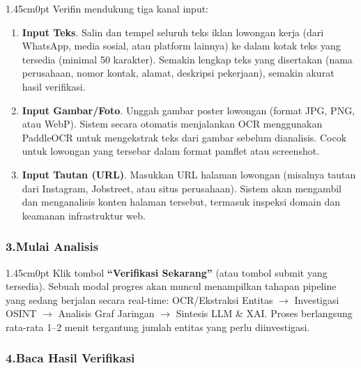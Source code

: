 \documentclass[12pt,a4paper]{article}
\begin{document}
\begin{adjustwidth}{1.45cm}{0pt}
\hspace*{0.85cm}Verifin mendukung tiga kanal input:

\begin{enumerate}[label=\textbf{\alph*.}, labelindent=0pt, leftmargin=*]
  \item \textbf{Input Teks}. Salin dan tempel seluruh teks iklan lowongan kerja (dari WhatsApp, media sosial, atau platform lainnya) ke dalam kotak teks yang tersedia (minimal 50 karakter). Semakin lengkap teks yang disertakan (nama perusahaan, nomor kontak, alamat, deskripsi pekerjaan), semakin akurat hasil verifikasi.
  \item \textbf{Input Gambar/Foto}. Unggah gambar poster lowongan (format JPG, PNG, atau WebP). Sistem secara otomatis menjalankan OCR menggunakan PaddleOCR untuk mengekstrak teks dari gambar sebelum dianalisis. Cocok untuk lowongan yang tersebar dalam format pamflet atau screenshot.
  \item \textbf{Input Tautan (URL)}. Masukkan URL halaman lowongan (misalnya tautan dari Instagram, Jobstreet, atau situs perusahaan). Sistem akan mengambil dan menganalisis konten halaman tersebut, termasuk inspeksi domain dan keamanan infrastruktur web.
\end{enumerate}
\end{adjustwidth}

\subsubsection*{3.\quad Mulai Analisis}

\begin{adjustwidth}{1.45cm}{0pt}
\hspace*{0.85cm}Klik tombol \textbf{``Verifikasi Sekarang''} (atau tombol submit yang tersedia). Sebuah modal progres akan muncul menampilkan tahapan pipeline yang sedang berjalan secara real-time: OCR/Ekstraksi Entitas $\to$ Investigasi OSINT $\to$ Analisis Graf Jaringan $\to$ Sintesis LLM \& XAI. Proses berlangsung rata-rata 1--2 menit tergantung jumlah entitas yang perlu diinvestigasi.
\end{adjustwidth}

\subsubsection*{4.\quad Baca Hasil Verifikasi}
\end{document}
